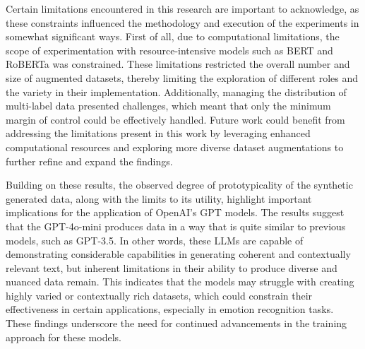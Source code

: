 \documentclass[manuscript]{clv3}
\begin{document}
Certain limitations encountered in this research are important to acknowledge, as these constraints influenced the methodology and execution of the experiments in somewhat significant ways. First of all, due to computational limitations, the scope of experimentation with resource-intensive models such as BERT and RoBERTa was constrained. These limitations restricted the overall number and size of augmented datasets, thereby limiting the exploration of different roles and the variety in their implementation. Additionally, managing the distribution of multi-label data presented challenges, which meant that only the minimum margin of control could be effectively handled. Future work could benefit from addressing the limitations present in this work by leveraging enhanced computational resources and exploring more diverse dataset augmentations to further refine and expand the findings. 

Building on these results, the observed degree of prototypicality of the synthetic generated data, along with the limits to its utility, highlight important implications for the application of OpenAI's GPT models. The results suggest that the GPT-4o-mini produces data in a way that is quite similar to previous models, such as GPT-3.5. In other words, these LLMs are capable of demonstrating considerable capabilities in generating coherent and contextually relevant text, but inherent limitations in their ability to produce diverse and nuanced data remain. This indicates that the models may struggle with creating highly varied or contextually rich datasets, which could constrain their effectiveness in certain applications, especially in emotion recognition tasks. These findings underscore the need for continued advancements in the training approach for these models.
\end{document}
